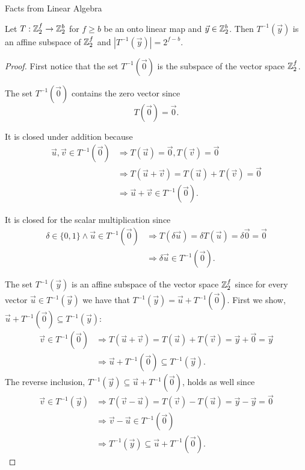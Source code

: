 \begin{chapter}{Facts from Linear Algebra}
\begin{lemma}
\label{lemma-linear-transformation-domain-distribution}
Let $T: \mathbb{Z}_{2}^{f} \rightarrow \mathbb{Z}_{2}^{b}$ for $f \geq b$ be an onto linear map and $\vec{y} \in \mathbb{Z}_{2}^{b}$. Then $T^{-1}(\vec{y})$ is an affine subspace of $\mathbb{Z}_{2}^{f}$ and $|T^{-1}(\vec{y})| = 2 ^ {f - b}$.
\end{lemma}
\begin{proof}
First notice that the set $T^{-1}(\vec{0})$ is the subspace of the vector space $\mathbb{Z}_{2}^{f}$.

The set $T^{-1}(\vec{0})$ contains the zero vector since
\[ 
	T(\vec{0}) = \vec{0} \text{.} 
\]

It is closed under addition because
\[
\begin{split}
\vec{u}, \vec{v} \in T^{-1}(\vec{0}) 
	& \Rightarrow T(\vec{u}) = \vec{0}, T(\vec{v}) = \vec{0} \\ 
	& \Rightarrow T(\vec{u} + \vec{v}) = T(\vec{u}) + T(\vec{v}) = \vec{0} \\ 
	& \Rightarrow \vec{u} + \vec{v} \in T^{-1}(\vec{0}) \text{.}
\end{split}
\]

It is closed for the scalar multiplication since
\[
\begin{split}
\delta \in \{0, 1\} \wedge \vec{u} \in T^{-1}(\vec{0}) 
	& \Rightarrow T(\delta \vec{u}) = \delta T(\vec{u}) = \delta \vec{0} = \vec{0} \\
	& \Rightarrow \delta \vec{u} \in T^{-1}(\vec{0}) \text{.}
\end{split}
\]

The set $T^{-1}(\vec{y})$ is an affine subspace of the vector space $\mathbb{Z}_{2}^{f}$ since for every vector $\vec{u} \in T^{-1}(\vec{y})$ we have that $T^{-1}(\vec{y}) = \vec{u} + T^{-1}(\vec{0})$. First we show, $\vec{u} + T^{-1}(\vec{0}) \subseteq T^{-1}(\vec{y})$:
\[
\begin{split}
\vec{v} \in T^{-1}(\vec{0}) 
	& \Rightarrow T(\vec{u} + \vec{v}) = T(\vec{u}) + T(\vec{v}) = \vec{y} + \vec{0} = \vec{y}  \\
	& \Rightarrow \vec{u} + T^{-1}(\vec{0}) \subseteq T^{-1}(\vec{y}) \text{.}
\end{split}
\]
The reverse inclusion, $T^{-1}(\vec{y}) \subseteq \vec{u} + T^{-1}(\vec{0})$, holds as well since
\[
\begin{split}
\vec{v} \in T^{-1}(\vec{y}) 
	& \Rightarrow T(\vec{v} - \vec{u}) = T(\vec{v}) - T(\vec{u}) = \vec{y} - \vec{y} = \vec{0} \\
	& \Rightarrow \vec{v} - \vec{u} \in T^{-1}(\vec{0}) \\
	& \Rightarrow T^{-1}(\vec{y}) \subseteq \vec{u} + T^{-1}(\vec{0}) \text{.}
\end{split}
\]


\end{proof}
\end{chapter}
